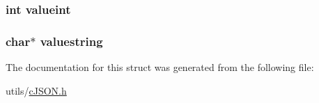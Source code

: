 \hypertarget{structc_j_s_o_n_af69506d34291edd0be9fa15660ac01ec}{
\subsubsection[{valueint}]{\setlength{\rightskip}{0pt plus 5cm}int valueint}}\label{structc_j_s_o_n_af69506d34291edd0be9fa15660ac01ec}
\hypertarget{structc_j_s_o_n_a4d2b95f0dc1f37a46452f5ddd6963455}{
\subsubsection[{valuestring}]{\setlength{\rightskip}{0pt plus 5cm}char$\ast$ valuestring}}\label{structc_j_s_o_n_a4d2b95f0dc1f37a46452f5ddd6963455}


The documentation for this struct was generated from the following file\-:\begin{DoxyCompactItemize}
\item 
utils/\hyperlink{c_j_s_o_n_8h}{c\-J\-S\-O\-N.\-h}\end{DoxyCompactItemize}
